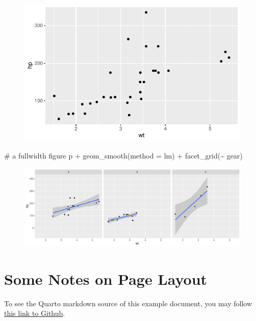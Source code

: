 \documentclass[
  letterpaper,
  DIV=11,
  numbers=noendperiod,
  oneside]{scrartcl}
\newenvironment{Shaded}{\begin{snugshade}}{\end{snugshade}}
\newcommand{\AttributeTok}[1]{\textcolor[rgb]{0.40,0.45,0.13}{#1}}
\newcommand{\CommentTok}[1]{\textcolor[rgb]{0.37,0.37,0.37}{#1}}
\newcommand{\FunctionTok}[1]{\textcolor[rgb]{0.28,0.35,0.67}{#1}}
\newcommand{\NormalTok}[1]{\textcolor[rgb]{0.00,0.23,0.31}{#1}}
\newcommand{\SpecialCharTok}[1]{\textcolor[rgb]{0.37,0.37,0.37}{#1}}
\newcommand{\StringTok}[1]{\textcolor[rgb]{0.13,0.47,0.30}{#1}}
\begin{document}
\begin{figure}[H]

{\centering \includegraphics{cv_files/figure-pdf/unnamed-chunk-12-1.pdf}

}

\end{figure}

\begin{Shaded}
\begin{Highlighting}[]
\CommentTok{\# a fullwidth figure}
\NormalTok{p }\SpecialCharTok{+} \FunctionTok{geom\_smooth}\NormalTok{(}\AttributeTok{method =} \StringTok{\textquotesingle{}lm\textquotesingle{}}\NormalTok{) }\SpecialCharTok{+} \FunctionTok{facet\_grid}\NormalTok{(}\SpecialCharTok{\textasciitilde{}}\NormalTok{ gear)}
\end{Highlighting}
\end{Shaded}

\begin{figure}[H]

{\centering \includegraphics{cv_files/figure-pdf/unnamed-chunk-13-1.pdf}

}

\end{figure}

\hypertarget{some-notes-on-page-layout}{%
\section{Some Notes on Page Layout}\label{some-notes-on-page-layout}}

To see the Quarto markdown source of this example document, you may
follow
\href{https://raw.githubusercontent.com/quarto-dev/quarto-gallery/main/page-layout/tufte.qmd}{this
link to Github}.
\end{document}
